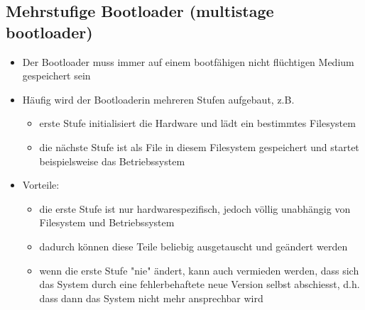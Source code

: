 \subsection{Mehrstufige Bootloader (multistage bootloader)}
\begin{itemize}
	\item Der Bootloader muss immer auf einem bootfähigen nicht flüchtigen Medium gespeichert sein
	\item Häufig wird der Bootloaderin mehreren Stufen aufgebaut, z.B. 
	\begin{itemize}
		\item erste Stufe initialisiert die Hardware und lädt ein bestimmtes Filesystem 
		\item die nächste Stufe ist als File in diesem Filesystem gespeichert und startet beispielsweise das Betriebssystem 
	\end{itemize}
	\item Vorteile: 
	\begin{itemize}
		\item die erste Stufe ist nur hardwarespezifisch, jedoch völlig unabhängig von Filesystem und Betriebssystem 
		\item  dadurch können diese Teile beliebig ausgetauscht und geändert werden 
		\item wenn die erste Stufe "nie" ändert, kann auch vermieden werden, dass sich das System durch eine fehlerbehaftete neue Version selbst abschiesst, d.h. dass dann das System nicht mehr ansprechbar wird
	\end{itemize}
\end{itemize}

